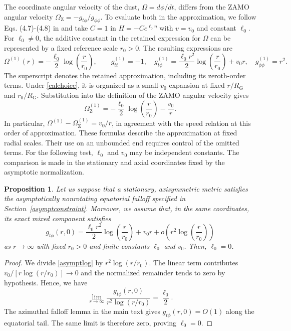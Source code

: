 \documentclass[amsmath,amsfonts,amssymb,aps,pra,superscriptaddress,10pt]{revtex4-2}
\numberwithin{equation}{section}
\theoremstyle{plain}
\newtheorem{proposition}{Proposition}
\theoremstyle{definition}
\theoremstyle{remark}
\theoremstyle{definition}
\newcommand{\ellzero}{\ell_0}
\newcommand{\RG}{R_{\mathrm G}}
\newcommand{\OmZ}{\Omega_{\mathrm Z}}
\begin{document}
The coordinate angular velocity of the dust, $\Omega=d\phi/dt$, differs from the ZAMO angular velocity $\OmZ=-g_{t\phi}/g_{\phi\phi}$. To evaluate both in the approximation, we follow Eqs. (4.7)-(4.8) in \cite{Astesiano2022EPJC} and take $C=1$ in $H=-Ce^{\ellzero\eta}$ with $v=v_0$ and constant $\ellzero$. For $\ellzero\neq 0$, the additive constant in the retained expression for $\Omega$ can be represented by a fixed reference scale $r_0>0$. The resulting expressions are
\begin{equation}
\Omega^{(1)}(r)=-\frac{\ellzero}{2}\log{\left(\frac{r}{r_0}\right)},\qquad
g_{tt}^{(1)}=-1,\quad
g_{t\phi}^{(1)}=\frac{\ellzero r^2}{2}\log{\left(\frac{r}{r_0}\right)}+v_0r,\quad
g_{\phi\phi}^{(1)}=r^2.
\end{equation}
The superscript denotes the retained approximation, including its zeroth-order terms. Under \eqref{calchoice}, it is organized as a small-$v_0$ expansion at fixed $r/\RG$ and $r_0/\RG$. Substitution into the definition of the ZAMO angular velocity gives
\begin{equation}
\OmZ^{(1)}=-\frac{\ellzero}{2}\log{\left(\frac{r}{r_0}\right)}-\frac{v_0}{r}.
\end{equation}
In particular, $\Omega^{(1)}-\OmZ^{(1)}=v_0/r$, in agreement with the speed relation at this order of approximation. These formulas describe the approximation at fixed radial scales. Their use on an unbounded end requires control of the omitted terms. For the following test, $\ellzero$ and $v_0$ may be independent constants. The comparison is made in the stationary and axial coordinates fixed by the asymptotic normalization.

\begin{proposition}\label{asymptconstr}
Let us suppose that a stationary, axisymmetric metric satisfies the asymptotically nonrotating equatorial falloff specified in Section~\ref{asymptconstraint}. Moreover, we assume that, in the same coordinates, its exact mixed component satisfies
\begin{equation}\label{asymptlog}
g_{t\phi}(r,0)=\frac{\ellzero r^2}{2}\log{\left(\frac{r}{r_0}\right)}+v_0r
+o\left(r^2\log{\left(\frac{r}{r_0}\right)}\right)
\end{equation}
as $r\to\infty$ with fixed $r_0>0$ and finite constants $\ellzero$ and $v_0$. Then, $\ellzero=0$.
\end{proposition}

\begin{proof}
We divide \eqref{asymptlog} by $r^2\log{(r/r_0)}$. The linear term contributes $v_0/[r\log{(r/r_0)}]\to 0$ and the normalized remainder tends to zero by hypothesis. Hence, we have
\begin{equation}
\lim_{r\to\infty}\frac{g_{t\phi}(r,0)}{r^2\log{(r/r_0)}}=\frac{\ellzero}{2}.
\end{equation}
The azimuthal falloff lemma in the main text gives $g_{t\phi}(r,0)=O(1)$ along the equatorial tail. The same limit is therefore zero, proving $\ellzero=0$.
\end{proof}
\end{document}
